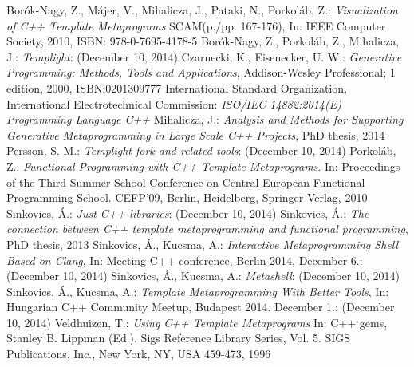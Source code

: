 
\begin{thebibliography}{99}
    Borók-Nagy, Z., Májer, V., Mihalicza, J., Pataki, N., Porkoláb, Z.:
    \textit{Visualization of C++ Template Metaprograms} SCAM(p./pp. 167-176),
    In: IEEE Computer Society, 2010, ISBN: 978-0-7695-4178-5
    Borók-Nagy, Z., Porkoláb, Z., Mihalicza, J.:
    \textit{Templight}:
     (December 10, 2014)
    Czarnecki, K., Eisenecker, U. W.:
    \textit{Generative Programming: Methods, Tools and Applications},
    Addison-Wesley Professional; 1 edition, 2000, ISBN:0201309777
    International Standard Organization, International Electrotechnical
    Commission: \textit{ISO/IEC 14882:2014(E) Programming Language C++}
    Mihalicza, J.:
    \textit{Analysis and Methods for Supporting Generative Metaprogramming in
    Large Scale C++ Projects}, PhD thesis, 2014
    Persson, S. M.:
    \textit{Templight fork and related tools}:
    (December 10, 2014)
    Porkoláb, Z.:
    \textit{Functional Programming with C++ Template Metaprograms}.
    In: Proceedings of the Third Summer School Conference on
    Central European Functional Programming School. CEFP’09, Berlin,
    Heidelberg, Springer-Verlag, 2010
    Sinkovics, Á.:
    \textit{Just C++ libraries}:
     (December 10, 2014)
    Sinkovics, Á.:
    \textit{The connection between C++ template metaprogramming and functional
    programming}, PhD thesis, 2013
    Sinkovics, Á., Kucsma, A.:
    \textit{Interactive Metaprogramming Shell Based on Clang}, In:
    Meeting C++ conference, Berlin 2014, December 6.:
    (December 10, 2014)
    Sinkovics, Á., Kucsma, A.:
    \textit{Metashell}:
     (December 10, 2014)
    Sinkovics, Á., Kucsma, A.:
    \textit{Template Metaprogramming With Better Tools}, In: Hungarian C++
    Community Meetup, Budapest 2014. December 1.:
    (December 10, 2014)
    Veldhuizen, T.:
    \textit{Using C++ Template Metaprograms} In: C++ gems, Stanley B. Lippman
    (Ed.). Sigs Reference Library Series, Vol. 5. SIGS Publications, Inc.,
    New York, NY, USA 459-473, 1996


\end{thebibliography}
